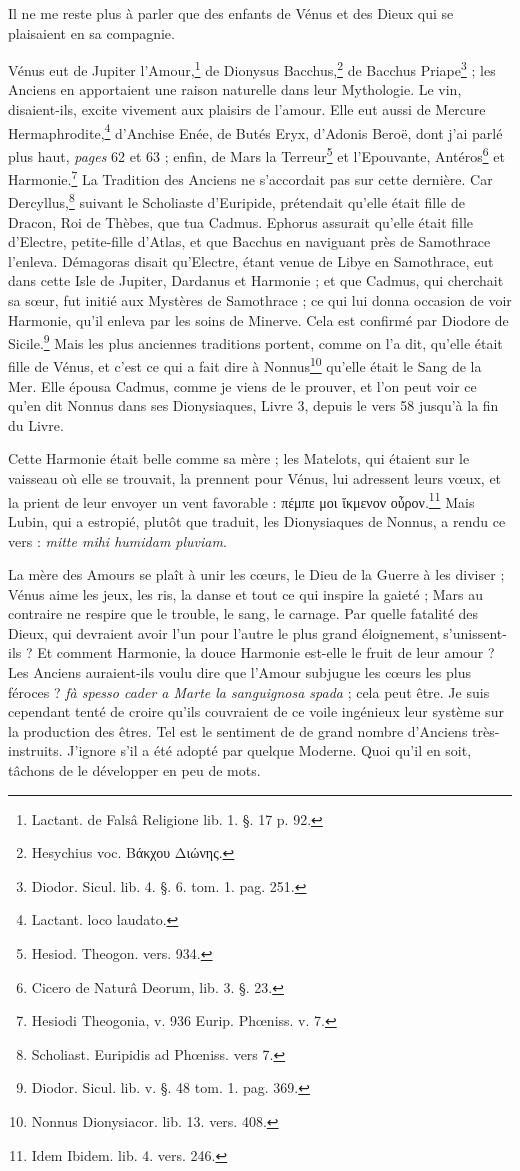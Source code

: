 \documentclass[a4paper, 18pt, oneside]{article}
\begin{document}
Il ne me reste plus à parler que des enfants de Vénus et des Dieux qui se plaisaient en sa compagnie.

Vénus eut de Jupiter l'Amour,\footnote{Lactant. de Falsâ Religione lib. 1. §. 17 p. 92.} de Dionysus Bacchus,\footnote{Hesychius voc. Βάκχου Διώνης.} de Bacchus Priape\footnote{Diodor. Sicul. lib. 4. §. 6. tom. 1. pag. 251.} ; les Anciens en apportaient une raison naturelle dans leur Mythologie. Le vin, disaient-ils, excite vivement aux plaisirs de l'amour. Elle eut aussi de Mercure Hermaphrodite,\footnote{Lactant. loco laudato.} d'Anchise Enée, de Butés Eryx, d'Adonis Beroë, dont j'ai parlé plus haut, \emph{pages} 62 et 63 ; enfin, de Mars la Terreur\footnote{Hesiod. Theogon. vers. 934.} et l'Epouvante, Antéros\footnote{Cicero de Naturâ Deorum, lib. 3. §. 23.} et Harmonie.\footnote{Hesiodi Theogonia, v. 936 Eurip. Phœniss. v. 7.} La Tradition des Anciens ne s'accordait pas sur cette dernière. Car Dercyllus,\footnote{Scholiast. Euripidis ad Phœniss. vers 7.} suivant le Scholiaste d'Euripide, prétendait qu'elle était fille de Dracon, Roi de Thèbes, que tua Cadmus. Ephorus assurait qu'elle était fille d'Electre, petite-fille d'Atlas, et que Bacchus en naviguant près de Samothrace l'enleva. Démagoras disait qu'Electre, étant venue de Libye en Samothrace, eut dans cette Isle de Jupiter, Dardanus et Harmonie ; et que Cadmus, qui cherchait sa sœur, fut initié aux Mystères de Samothrace ; ce qui lui donna occasion de voir Harmonie, qu'il enleva par les soins de Minerve. Cela est confirmé par Diodore de Sicile.\footnote{Diodor. Sicul. lib. v. §. 48 tom. 1. pag. 369.} Mais les plus anciennes traditions portent, comme on l'a dit, qu'elle était fille de Vénus, et c'est ce qui a fait dire à Nonnus\footnote{Nonnus Dionysiacor. lib. 13. vers. 408.} qu'elle était le Sang de la Mer. Elle épousa Cadmus, comme je viens de le prouver, et l'on peut voir ce qu'en dit Nonnus dans ses Dionysiaques, Livre 3, depuis le vers 58 jusqu'à la fin du Livre.

Cette Harmonie était belle comme sa mère ; les Matelots, qui étaient sur le vaisseau où elle se trouvait, la prennent pour Vénus, lui adressent leurs vœux, et la prient de leur envoyer un vent favorable : πέμπε μοι ἴκμενον οὖρον.\footnote{Idem Ibidem. lib. 4. vers. 246.} Mais Lubin, qui a estropié, plutôt que traduit, les Dionysiaques de Nonnus, a rendu ce vers : \emph{mitte mihi humidam pluviam}.

La mère des Amours se plaît à unir les cœurs, le Dieu de la Guerre à les diviser ; Vénus aime les jeux, les ris, la danse et tout ce qui inspire la gaieté ; Mars au contraire ne respire que le trouble, le sang, le carnage. Par quelle fatalité des Dieux, qui devraient avoir l'un pour l'autre le plus grand éloignement, s'unissent-ils ? Et comment Harmonie, la douce Harmonie est-elle le fruit de leur amour ? Les Anciens auraient-ils voulu dire que l'Amour subjugue les cœurs les plus féroces ? \emph{fà spesso cader a Marte la sanguignosa spada} ; cela peut être. Je suis cependant tenté de croire qu'ils couvraient de ce voile ingénieux leur système sur la production des êtres. Tel est le sentiment de de grand nombre d'Anciens très-instruits. J'ignore s'il a été adopté par quelque Moderne. Quoi qu'il en soit, tâchons de le développer en peu de mots.
\end{document}
